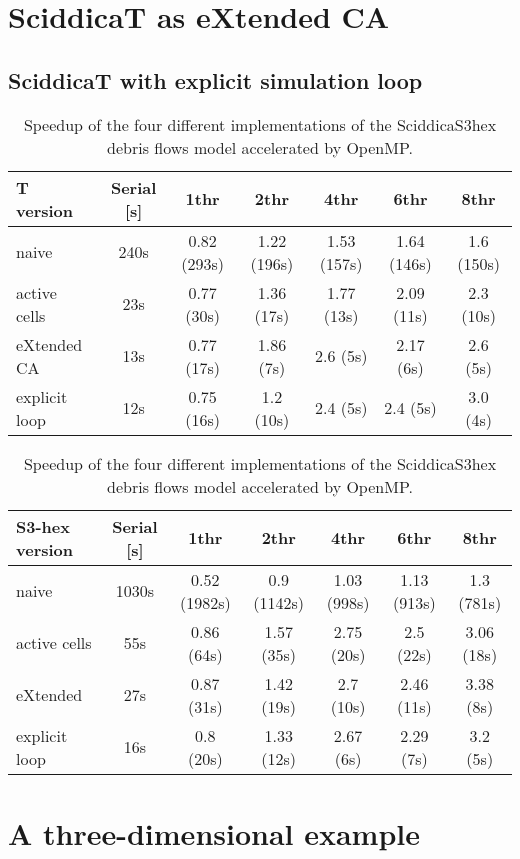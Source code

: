 \section{SciddicaT as eXtended CA}


\subsection{SciddicaT with explicit simulation loop}


\begin{table}
  \centering
  \begin{tabular}{l|c|c|c|c|c|c}
    \hline
    T version & Serial [s] & 1thr & 2thr & 4thr & 6thr & 8thr\\
    \hline
    \hline
    naive         & 240s & 0.82 (293s) & 1.22 (196s) & 1.53 (157s) & 1.64 (146s) & 1.6 (150s)\\
    active cells  & 23s  & 0.77 (30s)  & 1.36 (17s)  & 1.77 (13s)  & 2.09 (11s)  & 2.3 (10s)\\
    eXtended CA   & 13s  & 0.77 (17s)  & 1.86 (7s)   & 2.6  (5s)   & 2.17  (6s)  & 2.6 (5s)\\
    explicit loop & 12s  & 0.75 (16s)  & 1.2  (10s)  & 2.4  (5s)   & 2.4  (5s)   & 3.0 (4s)\\
    \hline
  \end{tabular}
  \caption{Speedup of the four different
    implementations of the SciddicaS3hex debris flows model accelerated by OpenMP.}
  \label{tab:speedup}
\end{table} 

\begin{table}
  \centering
  \begin{tabular}{l|c|c|c|c|c|c}
    \hline
    S3-hex version & Serial [s] & 1thr & 2thr & 4thr & 6thr & 8thr\\
    \hline
    \hline
    naive         & 1030s & 0.52 (1982s) & 0.9 (1142s) & 1.03 (998s) & 1.13 (913s) & 1.3  (781s)\\
    active cells  & 55s   & 0.86 (64s)   & 1.57 (35s)  & 2.75 (20s)  & 2.5  (22s)  & 3.06 (18s)\\
    eXtended      & 27s   & 0.87 (31s)   & 1.42 (19s)  & 2.7  (10s)  & 2.46 (11s)  & 3.38 (8s)\\
    explicit loop & 16s   & 0.8  (20s)   & 1.33 (12s)  & 2.67 (6s)  & 2.29  (7s)   & 3.2  (5s)\\
    \hline
  \end{tabular}
  \caption{Speedup of the four different
    implementations of the SciddicaS3hex debris flows model accelerated by OpenMP.}
  \label{tab:speedup}
\end{table} 


\section{A three-dimensional example}
